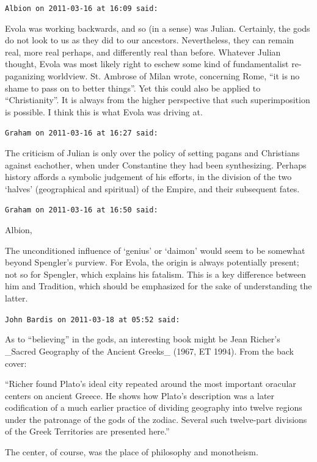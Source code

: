 \begin{footnotesize}
\begin{sffamily}
\hfill

\texttt{Albion on 2011-03-16 at 16:09 said:}

Evola was working backwards, and so (in a sense) was Julian. Certainly, the gods do not look to us as they did to our ancestors. Nevertheless, they can remain real, more real perhaps, and differently real than before. Whatever Julian thought, Evola was most likely right to eschew some kind of fundamentalist re-paganizing worldview. St. Ambrose of Milan wrote, concerning Rome, ``it is no shame to pass on to better things''. Yet this could also be applied to ``Christianity''. It is always from the higher perspective that such superimposition is possible. I think this is what Evola was driving at.

\hfill

\texttt{Graham on 2011-03-16 at 16:27 said:}

The criticism of Julian is only over the policy of setting pagans and Christians against eachother, when under Constantine they had been synthesizing. Perhaps history affords a symbolic judgement of his efforts, in the division of the two `halves' (geographical and spiritual) of the Empire, and their subsequent fates.

\hfill

\texttt{Graham on 2011-03-16 at 16:50 said:}

Albion,

The unconditioned influence of `genius' or `daimon' would seem to be somewhat beyond Spengler's purview. For Evola, the origin is always potentially present; not so for Spengler, which explains his fatalism. This is a key difference between him and Tradition, which should be emphasized for the sake of understanding the latter.

\hfill

\texttt{John Bardis on 2011-03-18 at 05:52 said:}

As to ``believing'' in the gods, an interesting book might be Jean Richer's \_Sacred Geography of the Ancient Greeks\_ (1967, ET 1994). From the back cover:

``Richer found Plato's ideal city repeated around the most important oracular centers on ancient Greece. He shows how Plato's description was a later codification of a much earlier practice of dividing geography into twelve regions under the patronage of the gods of the zodiac. Several such twelve-part divisions of the Greek Territories are presented here.''

The center, of course, was the place of philosophy and monotheism.


\end{sffamily}
\end{footnotesize}
